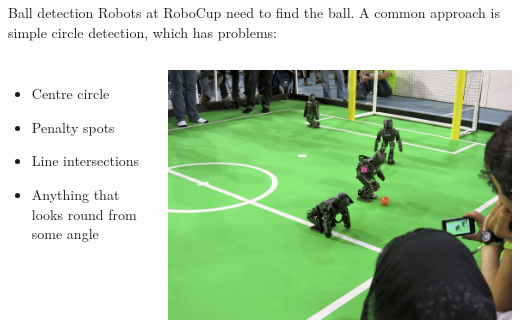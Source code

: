 \begin{frame}{Ball detection}
	Robots at RoboCup \citep{KitanoAKNO97} need to find the ball.
	A common approach is simple circle detection, which has problems: %

	\begin{columns}
		\begin{itemize}
			\item Centre circle
			\item Penalty spots
			\item Line intersections
			\item Anything that looks round from some angle
		\end{itemize}
			 \centering
			 \includegraphics[width=\linewidth]{field2}
	\end{columns}
\end{frame}

